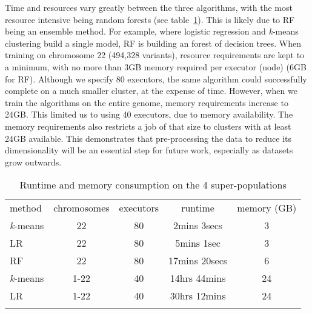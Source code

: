 \documentclass{llncs}
\newcommand{\kMeans}{\textit{k}-means }
\begin{document}
{Time and resources vary greatly between the three algorithms, with the most resource intensive being random forests (see table~\ref{resources}).
This is likely due to RF being an ensemble method. For example, where logistic regression and \kMeans{} clustering build a single model,
RF is building an forest of decision trees.
When training on chromosome 22 (494,328 variants), resource requirements are kept to a minimum, with no more than 3GB memory required per executor (node)
(6GB for RF). Although we specify 80 executors, the same algorithm could successfully complete on a much smaller cluster, at the expense of time. 
However, when we train the algorithms on the entire genome, memory requirements increase to 24GB. This limited us to using 40 executors, due to memory availability.
The memory requirements also restricts a job of that size to clusters with at least 24GB available. This demonstrates that pre-processing the data to reduce its dimensionality will
be an essential step for future work, especially as datasets grow outwards.


\begin{table}
\caption{Runtime and memory consumption on the 4 super-populations}
\begin{center}
\renewcommand{\arraystretch}{1.4}
\setlength\tabcolsep{3pt}
\begin{tabular}{lcccc}
\hline\noalign{\smallskip}
method  & chromosomes & executors & runtime & memory (GB) \\
\kMeans & 22 & 80 & 2mins 3secs & 3 \\
LR  & 22 & 80 & 5mins 1sec & 3 \\
RF & 22 & 80 & 17mins 20secs & 6 \\
\kMeans & 1-22 & 40 & 14hrs 44mins & 24 \\
LR  & 1-22 & 40 & 30hrs 12mins & 24 \\
\noalign{\smallskip}
\hline
\label{resources}
\end{tabular}
\end{center}
\end{table}




}
\end{document}
